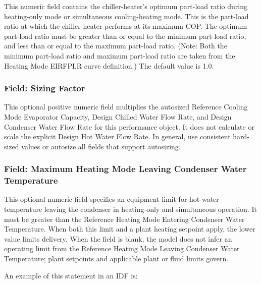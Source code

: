 This numeric field contains the chiller-heater's optimum part-load ratio during heating-only mode or simultaneous cooling-heating mode. This is the part-load ratio at which the chiller-heater performs at its maximum COP. The optimum part-load ratio must be greater than or equal to the minimum part-load ratio, and less than or equal to the maximum part-load ratio. (Note: Both the minimum part-load ratio and maximum part-load ratio are taken from the Heating Mode EIRFPLR curve definition.) The default value is 1.0.

\subsubsection{Field: Sizing Factor}\label{field-sizing-factor-12}

This optional positive numeric field multiplies the autosized Reference Cooling Mode Evaporator Capacity, Design Chilled Water Flow Rate, and Design Condenser Water Flow Rate for this performance object. It does not calculate or scale the explicit Design Hot Water Flow Rate. In general, use consistent hard-sized values or autosize all fields that support autosizing.

\subsubsection{Field: Maximum Heating Mode Leaving Condenser Water Temperature}\label{field-maximum-heating-mode-leaving-condenser-water-temperature}

This optional numeric field specifies an equipment limit for hot-water temperature leaving the condenser in heating-only and simultaneous operation. It must be greater than the Reference Heating Mode Entering Condenser Water Temperature. When both this limit and a plant heating setpoint apply, the lower value limits delivery. When the field is blank, the model does not infer an operating limit from the Reference Heating Mode Leaving Condenser Water Temperature; plant setpoints and applicable plant or fluid limits govern.

An example of this statement in an IDF is:

